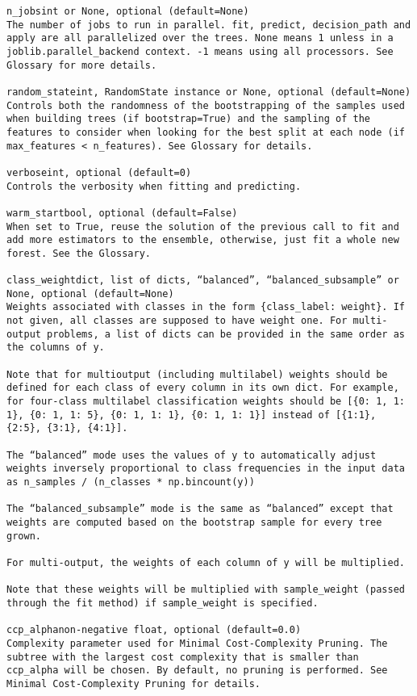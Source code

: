 \documentclass[12pt]{article}
\begin{document}
\begin{verbatim}
n_jobsint or None, optional (default=None)
The number of jobs to run in parallel. fit, predict, decision_path and apply are all parallelized over the trees. None means 1 unless in a joblib.parallel_backend context. -1 means using all processors. See Glossary for more details.

random_stateint, RandomState instance or None, optional (default=None)
Controls both the randomness of the bootstrapping of the samples used when building trees (if bootstrap=True) and the sampling of the features to consider when looking for the best split at each node (if max_features < n_features). See Glossary for details.

verboseint, optional (default=0)
Controls the verbosity when fitting and predicting.

warm_startbool, optional (default=False)
When set to True, reuse the solution of the previous call to fit and add more estimators to the ensemble, otherwise, just fit a whole new forest. See the Glossary.

class_weightdict, list of dicts, “balanced”, “balanced_subsample” or None, optional (default=None)
Weights associated with classes in the form {class_label: weight}. If not given, all classes are supposed to have weight one. For multi-output problems, a list of dicts can be provided in the same order as the columns of y.

Note that for multioutput (including multilabel) weights should be defined for each class of every column in its own dict. For example, for four-class multilabel classification weights should be [{0: 1, 1: 1}, {0: 1, 1: 5}, {0: 1, 1: 1}, {0: 1, 1: 1}] instead of [{1:1}, {2:5}, {3:1}, {4:1}].

The “balanced” mode uses the values of y to automatically adjust weights inversely proportional to class frequencies in the input data as n_samples / (n_classes * np.bincount(y))

The “balanced_subsample” mode is the same as “balanced” except that weights are computed based on the bootstrap sample for every tree grown.

For multi-output, the weights of each column of y will be multiplied.

Note that these weights will be multiplied with sample_weight (passed through the fit method) if sample_weight is specified.

ccp_alphanon-negative float, optional (default=0.0)
Complexity parameter used for Minimal Cost-Complexity Pruning. The subtree with the largest cost complexity that is smaller than ccp_alpha will be chosen. By default, no pruning is performed. See Minimal Cost-Complexity Pruning for details.


\end{verbatim}
\end{document}
